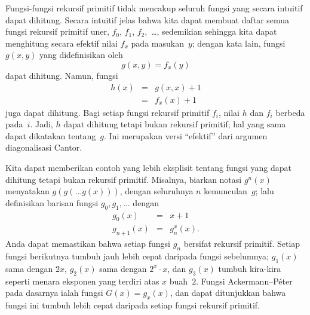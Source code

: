 \documentclass[../../../include/open-logic-section]{subfiles}
\begin{document}

Fungsi-fungsi rekursif primitif tidak mencakup seluruh fungsi yang secara
intuitif dapat dihitung. Secara intuitif jelas bahwa kita dapat membuat daftar
semua fungsi rekursif primitif uner, $f_0$, $f_1$, $f_2$,~\dots, sedemikian
sehingga kita dapat menghitung secara efektif nilai $f_x$ pada masukan~$y$;
dengan kata lain, fungsi $g(x,y)$ yang didefinisikan oleh
\[
g(x,y) = f_x(y)
\]
dapat dihitung. Namun, fungsi
\begin{eqnarray*}
h(x) & = & g(x,x) + 1 \\
& = & f_x(x) +1
\end{eqnarray*}
juga dapat dihitung. Bagi setiap fungsi rekursif primitif $f_i$, nilai $h$ dan
$f_i$ berbeda pada~$i$. Jadi, $h$ dapat dihitung tetapi bukan rekursif
primitif; hal yang sama dapat dikatakan tentang~$g$. Ini merupakan versi
``efektif'' dari argumen diagonalisasi Cantor.

Kita dapat memberikan contoh yang lebih eksplisit tentang fungsi yang dapat
dihitung tetapi bukan rekursif primitif. Misalnya, biarkan notasi $g^n(x)$
menyatakan $g(g(\dots g(x)))$, dengan seluruhnya $n$ kemunculan~$g$; lalu
definisikan barisan fungsi $g_0,g_1,\dots$ dengan
\begin{eqnarray*}
g_0(x) & = & x+1 \\
g_{n + 1}(x) & = & g_n^x(x).
\end{eqnarray*}
Anda dapat memastikan bahwa setiap fungsi $g_n$ bersifat rekursif primitif.
Setiap fungsi berikutnya tumbuh jauh lebih cepat daripada fungsi sebelumnya;
$g_1(x)$ sama dengan $2x$, $g_2(x)$ sama dengan $2^x\cdot x$, dan $g_3(x)$
tumbuh kira-kira seperti menara eksponen yang terdiri atas $x$ buah~$2$.
Fungsi Ackermann--P\'eter pada dasarnya ialah fungsi $G(x)=g_x(x)$, dan dapat
ditunjukkan bahwa fungsi ini tumbuh lebih cepat daripada setiap fungsi
rekursif primitif.
\end{document}
